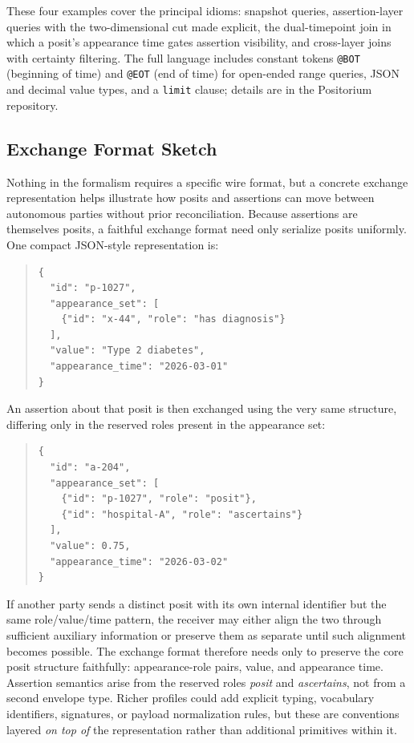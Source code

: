 \documentclass[a4paper,fleqn]{cas-sc}
\begin{document}
These four examples cover the principal idioms: snapshot queries, assertion-layer queries with the two-dimensional cut made explicit, the dual-timepoint join in which a posit's appearance time gates assertion visibility, and cross-layer joins with certainty filtering. The full language includes constant tokens \texttt{@BOT} (beginning of time) and \texttt{@EOT} (end of time) for open-ended range queries, JSON and decimal value types, and a \texttt{limit} clause; details are in the Positorium repository.

\subsection{Exchange Format Sketch}
Nothing in the formalism requires a specific wire format, but a concrete exchange representation helps illustrate how posits and assertions can move between autonomous parties without prior reconciliation. Because assertions are themselves posits, a faithful exchange format need only serialize posits uniformly. One compact JSON-style representation is:
\begin{quote}
\small
\begin{verbatim}
{
  "id": "p-1027",
  "appearance_set": [
    {"id": "x-44", "role": "has diagnosis"}
  ],
  "value": "Type 2 diabetes",
  "appearance_time": "2026-03-01"
}
\end{verbatim}
\end{quote}

An assertion about that posit is then exchanged using the very same structure, differing only in the reserved roles present in the appearance set:
\begin{quote}
\small
\begin{verbatim}
{
  "id": "a-204",
  "appearance_set": [
    {"id": "p-1027", "role": "posit"},
    {"id": "hospital-A", "role": "ascertains"}
  ],
  "value": 0.75,
  "appearance_time": "2026-03-02"
}
\end{verbatim}
\end{quote}

If another party sends a distinct posit with its own internal identifier but the same role/value/time pattern, the receiver may either align the two through sufficient auxiliary information or preserve them as separate until such alignment becomes possible. The exchange format therefore needs only to preserve the core posit structure faithfully: appearance-role pairs, value, and appearance time. Assertion semantics arise from the reserved roles \textit{posit} and \textit{ascertains}, not from a second envelope type. Richer profiles could add explicit typing, vocabulary identifiers, signatures, or payload normalization rules, but these are conventions layered \emph{on top of} the representation rather than additional primitives within it.
\end{document}
